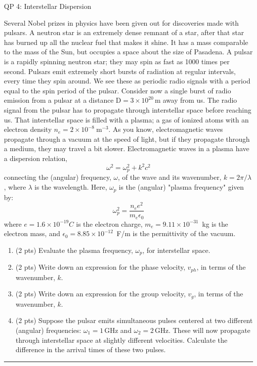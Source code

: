 \documentclass[12pt]{article}
\begin{document}
%
\begin{centering}
\LARGE{QP 4: Interstellar Dispersion}
\end{centering}
\bigskip
\bigskip

Several Nobel prizes in physics have been given out for discoveries made with pulsars. A neutron star is an extremely dense remnant of a star, after that star has burned up all the nuclear fuel that makes it shine. It has a mass comparable to the mass of the Sun, but occupies a space about the size of Pasadena.
A pulsar is a rapidly spinning neutron star; they may spin as fast as 1000 times per second.
Pulsars emit extremely short bursts of radiation at regular intervals, every
time they spin around. We see these as periodic radio signals with a period
equal to the spin period of the pulsar.
Consider now a single burst of radio emission from a pulsar at a distance
D$ = 3 \times 10^{20}$\,m away from us. The radio signal from the pulsar has to
propagate through interstellar space before reaching us. That interstellar
space is filled with a plasma; a gas of ionized atoms with an electron density
$n_e = 2 \times 10^{-8}~\mathrm{m}^{-3}$.
As you know, electromagnetic waves propagate through a vacuum at the
speed of light, but if they propagate through a medium, they may travel a
bit slower. Electromagnetic waves in a plasma have a dispersion relation,
\begin{equation}
\omega^2 = \omega_p^2 + k^2 c^2
\end{equation}
connecting the (angular) frequency, $\omega$, of the wave and its wavenumber, $k = 2 \pi / \lambda$, where $\lambda$ is the wavelength. Here, $\omega_p$ is the (angular) "plasma frequency" given by:
\begin{equation}
\omega_p^2 = \frac{n_e e^2}{m_e \epsilon_0}
\end{equation}
where $e = 1.6 \times 10^{-19} C$ is the electron charge, $m_e = 9.11 \times 10^{-31}$~kg is the electron mass, and $\epsilon_0 = 8.85 \times 10^{-12}$~F/m is the permittivity of the vacuum.
\begin{enumerate}[label=(\alph*)]
\item (2 pts)
Evaluate the plasma frequency, $\omega_p$, for interstellar space.

\item (2 pts)
Write down an expression for the phase velocity, $v_{ph}$, in terms of the
wavenumber, $k$.

\item (2 pts)
Write down an expression for the group velocity, $v_{g}$, in terms of the
wavenumber, $k$.

\item (2 pts)
Suppose the pulsar emits simultaneous pulses centered at two different
(angular) frequencies: $\omega_1 = 1$\,GHz and $\omega_2 = 2$\,GHz.
These will now propagate through interstellar space at slightly
different velocities. Calculate the difference in the arrival times of these
two pulses.

\end{enumerate}
\bigskip
{\color{Sepia} \hrule}



\end{document}
